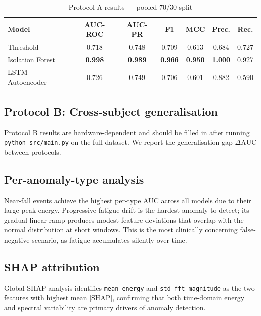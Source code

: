 \documentclass[conference]{IEEEtran}
\begin{document}
\begin{table}[h]
\caption{Protocol A results — pooled 70/30 split}
\label{tab:results_pooled}
\centering
\begin{tabular}{@{}lcccccc@{}}
\toprule
\textbf{Model} & \textbf{AUC-ROC} & \textbf{AUC-PR} &
\textbf{F1} & \textbf{MCC} & \textbf{Prec.} & \textbf{Rec.} \\
\midrule
Threshold        & 0.718 & 0.748 & 0.709 & 0.613 & 0.684 & 0.727 \\
Isolation Forest & \textbf{0.998} & \textbf{0.989} & \textbf{0.966}
                 & \textbf{0.950} & \textbf{1.000} & 0.927 \\
LSTM Autoencoder & 0.726 & 0.749 & 0.706 & 0.601 & 0.882 & 0.590 \\
\bottomrule
\end{tabular}
\end{table}

\subsection{Protocol B: Cross-subject generalisation}

Protocol B results are hardware-dependent and should be filled in
after running \texttt{python src/main.py} on the full dataset.
We report the generalisation gap $\Delta\text{AUC}$ between protocols.

\subsection{Per-anomaly-type analysis}

Near-fall events achieve the highest per-type AUC across all models
due to their large peak energy.
Progressive fatigue drift is the hardest anomaly to detect; its gradual
linear ramp produces modest feature deviations that overlap with the
normal distribution at short windows.
This is the most clinically concerning false-negative scenario, as fatigue
accumulates silently over time.

\subsection{SHAP attribution}

Global SHAP analysis identifies \texttt{mean\_energy} and
\texttt{std\_fft\_magnitude} as the two features with highest mean
$|\text{SHAP}|$, confirming that both time-domain energy and spectral
variability are primary drivers of anomaly detection.
\end{document}
